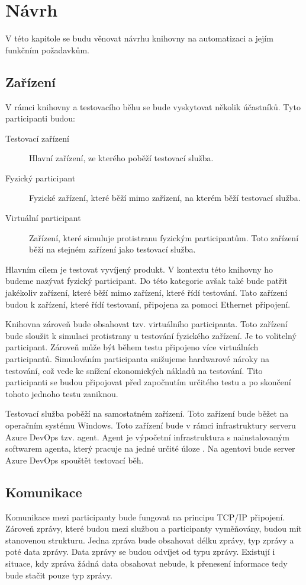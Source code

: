 \chapter{Návrh}

V této kapitole se budu věnovat návrhu knihovny na automatizaci a jejím funkčním požadavkům.

\section{Zařízení}
V rámci knihovny a testovacího běhu se bude vyskytovat několik účastníků. Tyto participanti budou:

\begin{description}
    \item[Testovací zařízení] Hlavní zařízení, ze kterého poběží testovací služba.
    \item[Fyzický participant] Fyzické zařízení, které běží mimo zařízení, na kterém běží testovací služba.
    \item[Virtuální participant] Zařízení, které simuluje protistranu fyzickým participantům. Toto zařízení běží na stejném zařízení jako testovací služba.
\end{description}

Hlavním cílem je testovat vyvíjený produkt. V kontextu této knihovny ho budeme nazývat fyzický participant. Do této kategorie avšak také bude patřit jakékoliv zařízení, které běží mimo zařízení, které řídí testování. Tato zařízení budou k zařízení, které řídí testovaní, připojena za pomoci Ethernet připojení.

Knihovna zároveň bude obsahovat tzv. virtuálního participanta. Toto zařízení bude sloužit k simulaci protistrany u testování fyzického zařízení. Je to volitelný participant. Zároveň může být během testu připojeno více virtuálních participantů. Simulováním participanta snižujeme hardwarové nároky na testování, což vede ke snížení ekonomických nákladů na testování. Tito participanti se budou připojovat před započnutím určitého testu a po skončení tohoto jednoho testu zaniknou.

Testovací služba poběží na samostatném zařízení. Toto zařízení bude běžet na operačním systému Windows. Toto zařízení bude v rámci infrastruktury serveru Azure DevOps tzv. agent. Agent je výpočetní infrastruktura s nainstalovaným softwarem agenta, který pracuje na jedné určité úloze \cite{agent_docs}. Na agentovi bude server Azure DevOps spouštět testovací běh.


\section{Komunikace}
Komunikace mezi participanty bude fungovat na principu TCP/IP připojení. Zároveň zprávy, které budou mezi službou a participanty vyměňovány, budou mít stanovenou strukturu. Jedna zpráva bude obsahovat délku zprávy, typ zprávy a poté data zprávy. Data zprávy se budou odvíjet od typu zprávy. Existují i situace, kdy zpráva žádná data obsahovat nebude, k přenesení informace tedy bude stačit pouze typ zprávy. 

